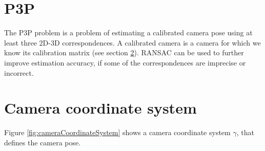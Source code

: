 \documentclass[twoside]{ctuthesis}
\theoremstyle{plain}
\theoremstyle{definition}
\theoremstyle{note}
\begin{document}
\section{P3P}
\label{section:P3P}
The P3P problem \cite{RANSAC} is a problem of estimating a calibrated camera pose using at least three 2D-3D correspondences. A calibrated camera is a camera for which we know its calibration matrix (see section \ref{section:cameraCS}). RANSAC \cite{RANSAC} can be used to further improve estimation accuracy, if some of the correspondences are imprecise or incorrect.

\section{Camera coordinate system}
\label{section:cameraCS}

Figure \ref{fig:cameraCoordinateSystem} shows a camera coordinate system $\gamma$, that defines the camera pose.
\end{document}
